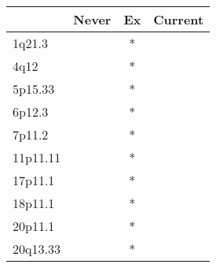 \begin{tabular}{lccc}
\toprule
{} & Never & Ex & Current \\
\midrule
1q21.3   &       &  * &         \\
4q12     &       &  * &         \\
5p15.33  &       &  * &         \\
6p12.3   &       &  * &         \\
7p11.2   &       &  * &         \\
11p11.11 &       &  * &         \\
17p11.1  &       &  * &         \\
18p11.1  &       &  * &         \\
20p11.1  &       &  * &         \\
20q13.33 &       &  * &         \\
\bottomrule
\end{tabular}
